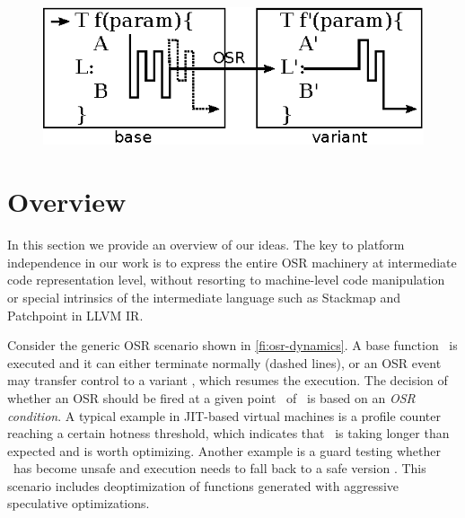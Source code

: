 
\ifdefined\noauthorea
\begin{figure}[b]
\begin{center}
\includegraphics[width=0.6\columnwidth]{figures/overview-osr/overview-osr.eps}
\caption{\protect}
\end{center}
\end{figure}
\fi

\section{Overview}
\label{se:overview}

In this section we provide an overview of our ideas. The key to platform independence in our work is to express the entire OSR machinery at intermediate code representation level, without resorting to machine-level code manipulation or special intrinsics of the intermediate language such as Stackmap and Patchpoint in LLVM IR. %


Consider the generic OSR scenario shown in \myfigure\ref{fi:osr-dynamics}. A base function \fbase\ is executed and it can either terminate normally (dashed lines), or an OSR event may transfer control to a variant \fvariant, which resumes the execution. The decision of whether an OSR should be fired at a given point \osrpoint\ of \fbase\ is based on an {\em OSR condition}. A typical example in JIT-based virtual machines is a profile counter reaching a certain hotness threshold, which indicates that \fbase\ is taking longer than expected and is worth optimizing. Another example is a guard testing whether \fbase\ has become unsafe and execution needs to fall back to a safe version \fvariant. This scenario includes deoptimization of functions generated with aggressive speculative optimizations. 

